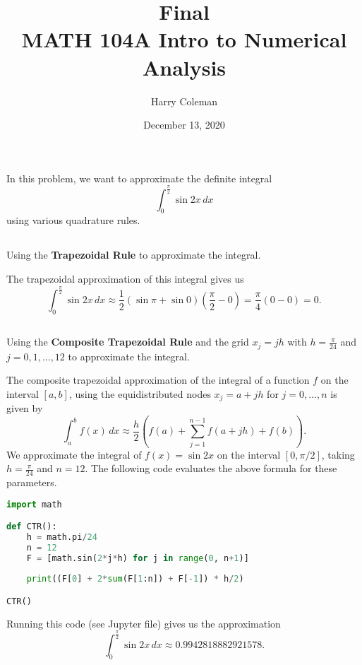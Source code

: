 \documentclass[12pt]{article}
\newenvironment{problem}
    {\begin{lrbox}{\mybox}\begin{minipage}{0.98\textwidth}}
    {\end{minipage}\end{lrbox}\framebox[\textwidth]{\usebox{\mybox}}}
\newcommand{\<}{\left\langle}
\renewcommand{\>}{\right\rangle}
\begin{document}
 
\title{Final\\
    \large MATH 104A Intro to Numerical Analysis
}
\author{Harry Coleman}
\date{December 13, 2020}
\maketitle

\section{}
\begin{problem}
    In this problem, we want to approximate the definite integral
    \[
        \int_0^{\frac{\pi}{2}} \sin 2x \,dx
    \]
    using various quadrature rules.
\end{problem}

\subsection{}
\begin{problem}
    Using the \textbf{Trapezoidal Rule} to approximate the integral.
\end{problem}
\medskip

The trapezoidal approximation of this integral gives us
\[
    \int_0^{\frac{\pi}{2}} \sin 2x \,dx 
        \approx \frac12 \left( \sin \pi + \sin 0 \right) \left( \frac{\pi}{2} - 0 \right)
        = \frac{\pi}{4}(0 - 0) = 0.
\]

\newpage
\subsection{}
\begin{problem}
    Using the \textbf{Composite Trapezoidal Rule} and the grid $x_j = jh$ with $h = \frac{\pi}{24}$ and $j = 0, 1, \dots, 12$ to approximate the integral.
\end{problem}
\medskip

The composite trapezoidal approximation of the integral of a function $f$ on the interval $[a, b]$, using the equidistributed nodes $x_j = a + jh$ for $j = 0, \dots, n$ is given by
\[
    \int_a^b f(x) \,dx \approx \frac{h}{2} \left( f(a) + \sum_{j = 1}^{n - 1} f(a + jh) + f(b) \right).
\]
We approximate the integral of $f(x) = \sin 2x$ on the interval $[0, \pi/2]$, taking $h = \frac{\pi}{24}$ and $n = 12$. The following code evaluates the above formula for these parameters.
\begin{lstlisting}[language=Python]
import math

def CTR():
    h = math.pi/24
    n = 12
    F = [math.sin(2*j*h) for j in range(0, n+1)]
    
    print((F[0] + 2*sum(F[1:n]) + F[-1]) * h/2)

CTR()
\end{lstlisting}
Running this code (see Jupyter file) gives us the approximation
\[
    \int_0^{\frac{\pi}{2}} \sin 2x \,dx \approx 0.9942818882921578.
\]
\end{document}
